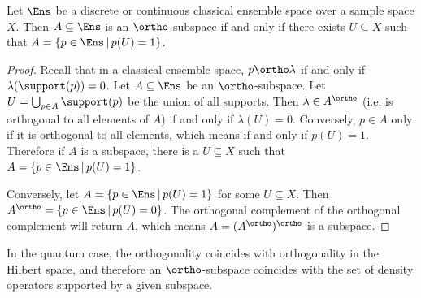 \begin{mathSection}
\begin{prop}
	Let $\Ens$ be a discrete or continuous classical ensemble space over a sample space $X$. Then $A \subseteq \Ens$ is an $\ortho$-subspace if and only if there exists $U \subseteq X$ such that $A = \{ p \in \Ens \, | \, p(U) = 1\}$.
\end{prop}

\begin{proof}
	Recall that in a classical ensemble space, $p \ortho \lambda$ if and only if $\lambda(\support(p)) = 0$. Let $A \subseteq \Ens$ be an $\ortho$-subspace. Let $U = \bigcup_{p \in A} \support(p)$ be the union of all supports. Then $\lambda \in A^{\ortho}$ (i.e. is orthogonal to all elements of $A$) if and only if $\lambda(U) = 0$. Conversely, $p \in A$ only if it is orthogonal to all elements, which means if and only if $p(U) = 1$. Therefore if $A$ is a subspace, there is a $U \subseteq X$ such that $A = \{ p \in \Ens \, | \, p(U) = 1\}$.
	
	Conversely, let $A = \{ p \in \Ens \, | \, p(U) = 1\}$ for some $U \subseteq X$. Then $A^{\ortho} = \{ p \in \Ens \, | \, p(U) = 0\}$. The orthogonal complement of the orthogonal complement will return $A$, which means $A = (A^{\ortho})^{\ortho}$ is a subspace.
\end{proof}
\end{mathSection}

In the quantum case, the orthogonality coincides with orthogonality in the Hilbert space, and therefore an $\ortho$-subspace coincides with the set of density operators supported by a given subspace.

